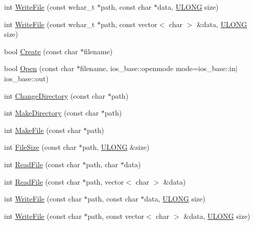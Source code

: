 \begin{DoxyCompactItemize}
int \hyperlink{class_y_compound_files_1_1_compound_file_a554fb5c28f9c4d1d42f33f99583a4967}{Write\+File} (const wchar\+\_\+t $\ast$path, const char $\ast$data, \hyperlink{_basic_excel_8hpp_abe09d1bea023be6a07cbadde8e955435}{U\+L\+O\+N\+G} size)
\item 
int \hyperlink{class_y_compound_files_1_1_compound_file_a73c89efa6826bf8051ed419fdaa3d289}{Write\+File} (const wchar\+\_\+t $\ast$path, const vector$<$ char $>$ \&data, \hyperlink{_basic_excel_8hpp_abe09d1bea023be6a07cbadde8e955435}{U\+L\+O\+N\+G} size)
\item 
bool \hyperlink{class_y_compound_files_1_1_compound_file_a12b9bb7ce39771cc233d4ff944df6181}{Create} (const char $\ast$filename)
\item 
bool \hyperlink{class_y_compound_files_1_1_compound_file_a66d3d1b8523a1ec9c43f0a8cd11190df}{Open} (const char $\ast$filename, ios\+\_\+base\+::openmode mode=ios\+\_\+base\+::in$\vert$ios\+\_\+base\+::out)
\item 
int \hyperlink{class_y_compound_files_1_1_compound_file_a5e1745f4a98a4da82d3c609392223fba}{Change\+Directory} (const char $\ast$path)
\item 
int \hyperlink{class_y_compound_files_1_1_compound_file_a973a7841893de0bfaad02be7d170be27}{Make\+Directory} (const char $\ast$path)
\item 
int \hyperlink{class_y_compound_files_1_1_compound_file_a772c378867d2734a55bfab5eca682c1c}{Make\+File} (const char $\ast$path)
\item 
int \hyperlink{class_y_compound_files_1_1_compound_file_ad9bc3b694a36fef87c76b1d6bdf89515}{File\+Size} (const char $\ast$path, \hyperlink{_basic_excel_8hpp_abe09d1bea023be6a07cbadde8e955435}{U\+L\+O\+N\+G} \&size)
\item 
int \hyperlink{class_y_compound_files_1_1_compound_file_ae19b936f56f36e02e958151befb3247c}{Read\+File} (const char $\ast$path, char $\ast$data)
\item 
int \hyperlink{class_y_compound_files_1_1_compound_file_a221d8fab5d542c5b71fd86707389724b}{Read\+File} (const char $\ast$path, vector$<$ char $>$ \&data)
\item 
int \hyperlink{class_y_compound_files_1_1_compound_file_ae61210da7aa1ebff0acfbc66bc29dfd1}{Write\+File} (const char $\ast$path, const char $\ast$data, \hyperlink{_basic_excel_8hpp_abe09d1bea023be6a07cbadde8e955435}{U\+L\+O\+N\+G} size)
\item 
int \hyperlink{class_y_compound_files_1_1_compound_file_adbf9ade5e8ccc8b0873e7a470d32918d}{Write\+File} (const char $\ast$path, const vector$<$ char $>$ \&data, \hyperlink{_basic_excel_8hpp_abe09d1bea023be6a07cbadde8e955435}{U\+L\+O\+N\+G} size)

\end{DoxyCompactItemize}
